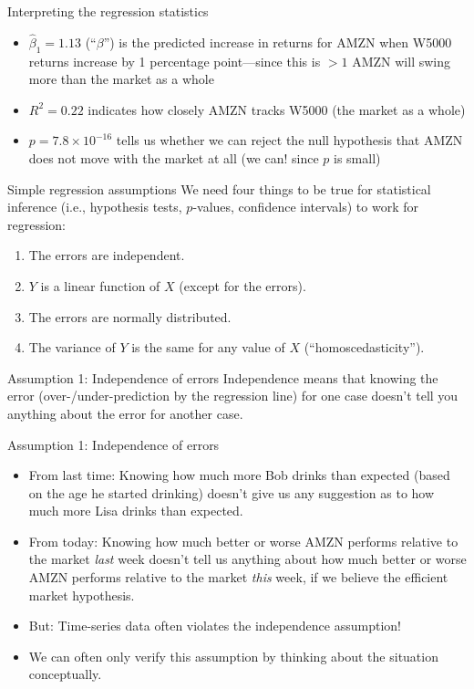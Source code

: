 \documentclass{beamer}\usepackage[]{graphicx}\usepackage[]{color}
\begin{document}
\begin{darkframes}
    \begin{frame}{Interpreting the regression statistics}
      \begin{itemize}[<+->]
        \item $\hat\beta_1=1.13$ (``$\beta$'') is the predicted increase in returns for AMZN when W5000 returns increase by 1 percentage point---since this is $>1$ AMZN will swing more than the market as a whole
        \item $R^2=0.22$ indicates how closely AMZN tracks W5000 (the market as a whole)
        \item $p=\ensuremath{7.8\times 10^{-16}}$ tells us whether we can reject the null hypothesis that AMZN does not move with the market at all \pause (we can! since $p$ is small)
      \end{itemize}
    \end{frame}

    \begin{frame}{Simple regression assumptions}
      We need four things to be true for statistical inference (i.e., hypothesis tests, $p$-values, confidence intervals) to work for regression:
      \pause
      \begin{enumerate}
        \item The errors are independent.
        \item $Y$ is a linear function of $X$ (except for the errors).
        \item The errors are normally distributed.
        \item The variance of $Y$ is the same for any value of $X$ (``homoscedasticity'').
      \end{enumerate}
    \end{frame}

    \begin{frame}{Assumption 1: Independence of errors}
      Independence means that knowing the error (over-/under-prediction by the regression line) for one case doesn't tell you anything about the error for another case.
    \end{frame}

    \begin{frame}{Assumption 1: Independence of errors}
      \begin{itemize}[<+->]
        \item From last time: Knowing how much more Bob drinks than expected (based on the age he started drinking) doesn't give us any suggestion as to how much more Lisa drinks than expected.
        \item From today: Knowing how much better or worse AMZN performs relative to the market \emph{last} week doesn't tell us anything about how much better or worse AMZN performs relative to the market \emph{this} week, if we believe the efficient market hypothesis.
        \item \alert{But:} Time-series data often violates the independence assumption!
        \item We can often only verify this assumption by thinking about the situation conceptually.
      \end{itemize}
    \end{frame}


\end{darkframes}
\end{document}

